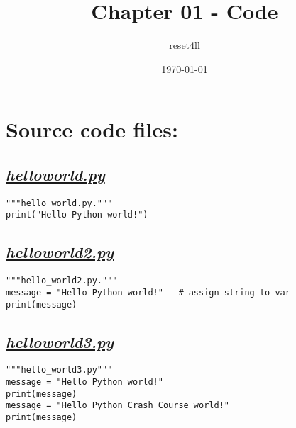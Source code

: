 \documentclass[11pt]{article}
\author{reset4ll}
\date{\today}
\title{Chapter 01 - Code}
\begin{document}
\maketitle
\tableofcontents


\section{Source code files:}
\label{sec:org48efe70}

\subsection{\underline{\emph{\textbf{helloworld.py}}}}
\label{sec:orgb8a6d6f}

\begin{verbatim}
"""hello_world.py."""
print("Hello Python world!")
\end{verbatim}

\subsection{\underline{\emph{\textbf{helloworld2.py}}}}
\label{sec:org279bc31}

\begin{verbatim}
"""hello_world2.py."""
message = "Hello Python world!"   # assign string to var
print(message)
\end{verbatim}

\subsection{\underline{\emph{\textbf{helloworld3.py}}}}
\label{sec:org7e1bd46}

\begin{verbatim}
"""hello_world3.py"""
message = "Hello Python world!"
print(message)
message = "Hello Python Crash Course world!"
print(message)
\end{verbatim}
\end{document}

